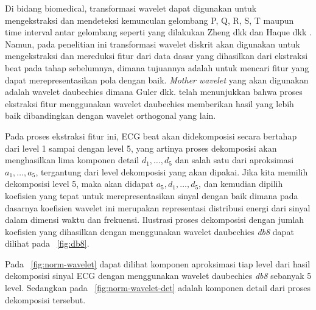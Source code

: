 
Di bidang biomedical, transformasi wavelet dapat digunakan untuk mengekstraksi
dan mendeteksi kemunculan gelombang P, Q, R, S, T maupun time interval antar
gelombang seperti yang dilakukan Zheng dkk\cite{Zheng:1995} dan Haque dkk
\cite{Haque:2002}. Namun, pada penelitian ini transformasi wavelet diskrit 
akan digunakan untuk mengekstraksi dan mereduksi fitur dari data dasar
yang dihasilkan dari ekstraksi beat pada tahap sebelumnya, dimana tujuannya
adalah untuk mencari fitur yang dapat merepresentasikan pola dengan baik.
\emph{Mother wavelet} yang akan digunakan adalah wavelet daubechies dimana Guler
dkk.\cite{Guler:2005} telah menunjukkan bahwa proses ekstraksi fitur menggunakan
wavelet daubechies memberikan hasil yang lebih baik dibandingkan dengan wavelet
orthogonal yang lain.

Pada proses ekstraksi fitur ini, ECG beat akan didekomposisi secara bertahap
dari level 1 sampai dengan level 5, yang artinya proses dekomposisi akan
menghasilkan lima komponen detail $d_1,\dots, d_5$ dan salah satu dari
aproksimasi $a_1, \dots, a_5$, tergantung dari level dekomposisi yang akan
dipakai. Jika kita memilih dekomposisi level 5, maka akan didapat $a_5,
d_1,\dots,d_5$, dan kemudian dipilih koefisien yang tepat untuk
merepresentasikan sinyal dengan baik dimana pada dasarnya koefisien wavelet ini
merupakan representasi distribusi energi dari sinyal dalam dimensi waktu dan
frekuensi. Ilustrasi proses dekomposisi dengan jumlah koefisien yang dihasilkan
dengan menggunakan wavelet daubechies \emph{db8} dapat dilihat pada
\pic~\ref{fig:db8}.

Pada \pic~\ref{fig:norm-wavelet} dapat dilihat komponen aproksimasi tiap
level dari hasil dekomposisi sinyal ECG dengan menggunakan wavelet daubechies
\emph{db8} sebanyak 5 level. Sedangkan pada \pic~\ref{fig:norm-wavelet-det}
adalah komponen detail dari proses dekomposisi tersebut.

  
